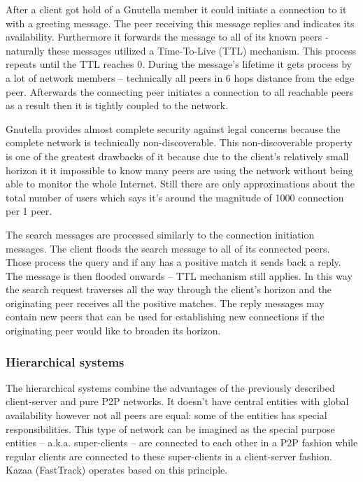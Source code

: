 \documentclass[a4paper]{article}
\begin{document}
After a client got hold of a Gnutella member it could initiate a connection to it with a greeting message. The peer
receiving this message replies and indicates its availability. Furthermore it forwards the message to all of its known
peers - naturally these messages utilized a Time-To-Live (TTL) mechanism. This process repeats until the TTL reaches 0.
During the message's lifetime it gets process by a lot of network members -- technically all peers in 6 hops distance
from the edge peer. Afterwards the connecting peer initiates a connection to all reachable peers as a result then it is
tightly coupled to the network.

Gnutella provides almost complete security against legal concerns because the complete network is technically
non-discoverable. This non-discoverable property is one of the greatest drawbacks of it because due to the client's
relatively small horizon it it impossible to know many peers are using the network without being able to monitor the
whole Internet. Still there are only approximations about the total number of users which says it's around the
magnitude of 1000 connection per 1 peer.

The search messages are processed similarly to the connection initiation messages. The client floods the search message
to all of its connected peers. Those process the query and if any has a positive match it sends back a reply. The
message is then flooded onwards -- TTL mechanism still applies. In this way the search request	traverses all the way
through the client's horizon and the originating peer receives all the positive matches. The reply messages may contain
new peers that can be used for establishing new connections if the originating peer would like to broaden its horizon.

\subsubsection{Hierarchical systems}

The hierarchical systems combine the advantages of the previously described client-server and pure P2P networks.
It doesn't have central entities with global availability however not all peers are equal: some of the entities has
special responsibilities.
This type of network can be imagined as the special purpose entities -- a.k.a. super-clients -- are connected to each
other in a P2P fashion while regular clients are connected to these super-clients in a client-server fashion.
Kazaa (FastTrack) operates based on this principle.
\end{document}

